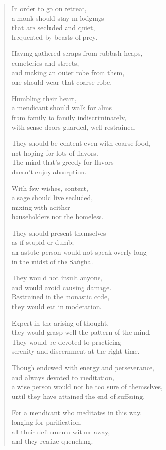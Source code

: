 \documentclass[12pt,openany]{book}%
\begin{document}
\begin{verse}%
In order to go on retreat, \\
a monk should stay in lodgings \\
that are secluded and quiet, \\
frequented by beasts of prey. 

Having gathered scraps from rubbish heaps, \\
cemeteries and streets, \\
and making an outer robe from them, \\
one should wear that coarse robe. 

Humbling their heart, \\
a mendicant should walk for alms \\
from family to family indiscriminately, \\
with sense doors guarded, well-restrained. 

They should be content even with coarse food, \\
not hoping for lots of flavors. \\
The mind that’s greedy for flavors \\
doesn’t enjoy absorption. 

With few wishes, content, \\
a sage should live secluded, \\
mixing with neither \\
householders nor the homeless. 

They should present themselves \\
as if stupid or dumb; \\
an astute person would not speak overly long \\
in the midst of the \textsanskrit{Saṅgha}. 

They would not insult anyone, \\
and would avoid causing damage. \\
Restrained in the monastic code, \\
they would eat in moderation. 

Expert in the arising of thought, \\
they would grasp well the pattern of the mind. \\
They would be devoted to practicing \\
serenity and discernment at the right time. 

Though endowed with energy and perseverance, \\
and always devoted to meditation, \\
a wise person would not be too sure of themselves, \\
until they have attained the end of suffering. 

For a mendicant who meditates in this way, \\
longing for purification, \\
all their defilements wither away, \\
and they realize quenching. 

%
\end{verse}
\end{document}
